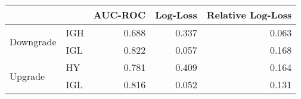 \begin{tabular}{llrrr}
\toprule
 &  & AUC-ROC & Log-Loss & Relative Log-Loss \\
\midrule
\multirow[t]{2}{*}{Downgrade} & IGH & 0.688 & 0.337 & 0.063 \\
 & IGL & 0.822 & 0.057 & 0.168 \\
\cline{1-5}
\multirow[t]{2}{*}{Upgrade} & HY & 0.781 & 0.409 & 0.164 \\
 & IGL & 0.816 & 0.052 & 0.131 \\
\cline{1-5}
\bottomrule
\end{tabular}
